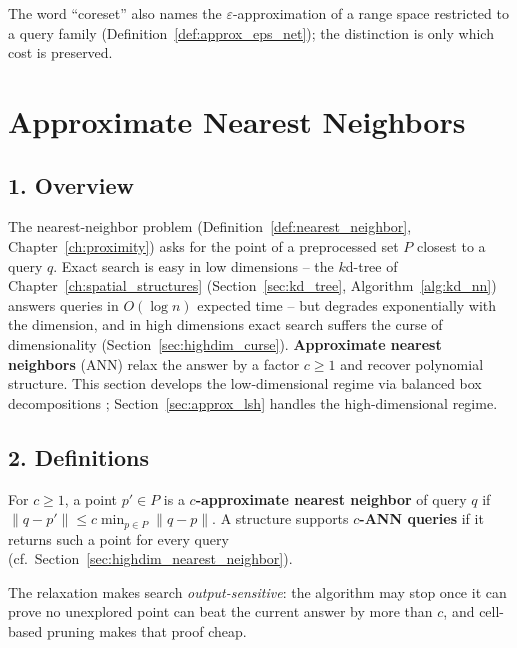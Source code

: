 \begin{remark}
  The word ``coreset'' also names the $\varepsilon$-approximation of a range
  space restricted to a query family (Definition~\ref{def:approx_eps_net});
  the distinction is only which cost is preserved.
\end{remark}


\section{Approximate Nearest Neighbors}
\label{sec:approx_ann}

\subsection{1. Overview}

The nearest-neighbor problem (Definition~\ref{def:nearest_neighbor},
Chapter~\ref{ch:proximity}) asks for the point of a preprocessed set $P$
closest to a query $q$. Exact search is easy in low dimensions -- the
$k$d-tree of Chapter~\ref{ch:spatial_structures}
(Section~\ref{sec:kd_tree}, Algorithm~\ref{alg:kd_nn}) answers queries in
$O(\log n)$ expected time -- but degrades exponentially with the dimension,
and in high dimensions exact search suffers the curse of dimensionality
(Section~\ref{sec:highdim_curse}). \textbf{Approximate nearest neighbors}
(ANN) relax the answer by a factor
$c \geq 1$ and recover polynomial structure. This section develops the
low-dimensional regime via balanced box decompositions \cite{arya1998};
Section~\ref{sec:approx_lsh} handles the high-dimensional regime.

\subsection{2. Definitions}

\begin{definition}\label{def:approx_ann_c}
  For $c \geq 1$, a point $p' \in P$ is a \textbf{$c$-approximate nearest
  neighbor} of query $q$ if $\|q - p'\| \leq c \min_{p \in P}\|q - p\|$. A
  structure supports \textbf{$c$-ANN queries} if it returns such a point
  for every query (cf.\ Section~\ref{sec:highdim_nearest_neighbor}).
\end{definition}

The relaxation makes search \emph{output-sensitive}: the algorithm may stop
once it can prove no unexplored point can beat the current answer by more
than $c$, and cell-based pruning makes that proof cheap.

